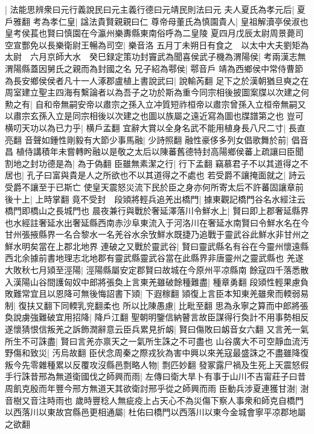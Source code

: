 |{
	法能思辨衆曰元行義說民曰元主義行德曰元靖民則法曰元}
夫人夏氏為孝元后|{
	夏戶雅翻}
考為孝仁皇|{
	諡法貴賢親親曰仁}
尊帝母董氏為慎園貴人|{
	皇祖解瀆亭侯淑也皇考侯萇也賢曰慎園在今瀛州樂夀縣東南俗呼為二皇陵}
夏四月戊辰太尉周景薨司空宣酆免以長樂衛尉王暢為司空|{
	樂音洛}
五月丁未朔日有食之　以太中大夫劉矩為太尉　六月京師大水　癸巳録定策功封竇武為聞喜侯武子機為渭陽侯|{
	考兩漢志無渭陽縣蓋因舅氏之親而為封國之名}
兄子紹為鄠侯|{
	鄠音戶}
靖為西鄉侯中常侍曹節為長安鄉侯侯者凡十一人涿郡盧植上書說武曰|{
	說輸芮翻}
足下之於漢朝猶旦奭之在周室建立聖主四海有繫論者以為吾子之功於斯為重今同宗相後披圖案牒以次建之何勲之有|{
	自和帝無嗣安帝以肅宗之孫入立冲質短祚桓帝以肅宗曾孫入立桓帝無嗣又以肅宗玄孫入立是同宗相後以次建之也圖以族屬之遠近寫為圖也牒譜第之也}
豈可横叨天功以為已力乎|{
	横戶孟翻}
宜辭大賞以全身名武不能用植身長八尺二寸|{
	長直亮翻}
音聲如鍾性剛毅有大節少事馬融|{
	少詩照翻}
融性豪侈多列女倡歌舞於前|{
	倡音昌}
植侍講積年未嘗轉盻融以是敬之太后以陳蕃舊德特封高陽鄉侯蕃上疏讓曰臣聞割地之封功德是為|{
	為于偽翻}
臣雖無素潔之行|{
	行下孟翻}
竊慕君子不以其道得之不居也|{
	孔子曰富與貴是人之所欲也不以其道得之不處也}
若受爵不讓掩面就之|{
	詩云受爵不讓至于已斯亡}
使皇天震怒災流下民於臣之身亦何所寄太后不許蕃固讓章前後十上|{
	上時掌翻}
竟不受封　段熲將輕兵追羌出橋門|{
	據東觀記橋門谷名水經注云橋門即橋山之長城門也}
晨夜兼行與戰於奢延澤落川令鮮水上|{
	賢曰即上郡奢延縣界也水經註奢延水出奢延縣西南赤沙阜東流入于河洛川在奢延水南賢曰令鮮水名在今甘州張掖縣界一名合黎水一名羌谷水余攷鮮水既捷乃追戰于靈武谷此鮮水非甘州之鮮水明矣當在上郡北地界}
連破之又戰於靈武谷|{
	賢曰靈武縣名有谷在今靈州懷遠縣西北余據前書地理志北地郡有靈武縣靈武谷當在此縣界非唐靈州之靈武縣也}
羌遂大敗秋七月熲至涇陽|{
	涇陽縣屬安定郡賢曰故城在今原州平凉縣南}
餘寇四千落悉散入漢陽山谷間護匈奴中郎將張奐上言東羌雖破餘種難盡|{
	種章勇翻}
段熲性輕果慮負敗難常宜且以恩降可無後悔詔書下熲|{
	下遐稼翻}
熲復上言臣本知東羌雖衆而輭弱易制|{
	復扶又翻下同輭乳兖翻柔也}
所以比陳愚慮|{
	比毗至翻}
思為永寧之算而中郎將張奐說虜強難破宜用招降|{
	降戶江翻}
聖朝明鑒信納瞽言故臣謀得行奐計不用事勢相反遂懷猜恨信叛羌之訴飾潤辭意云臣兵累見折衂|{
	賢曰傷敗曰衂音女六翻}
又言羌一氣所生不可誅盡|{
	賢曰言羌亦禀天之一氣所生誅之不可盡也}
山谷廣大不可空靜血流汚野傷和致災|{
	汚烏故翻}
臣伏念周秦之際戎狄為害中興以來羌寇最盛誅之不盡雖降復叛今先零雜種累以反覆攻沒縣邑剽略人物|{
	剽匹妙翻}
發冢露尸禍及生死上天震怒假手行誅昔邢為無道衛國伐之師興而雨|{
	左傳曰衛大旱卜有事于山川不吉甯莊子曰昔周飢克殷而年豐今邢方無道天其欲衛討邢乎從之師興而雨}
臣動兵涉夏連獲甘澍|{
	澍音樹又音注時雨也}
歲時豐稔人無疵疫上占天心不為災傷下察人事衆和師克自橋門以西落川以東故宫縣邑更相通屬|{
	杜佑曰橋門以西落川以東今金城會寧平凉郡地屬之欲翻}
